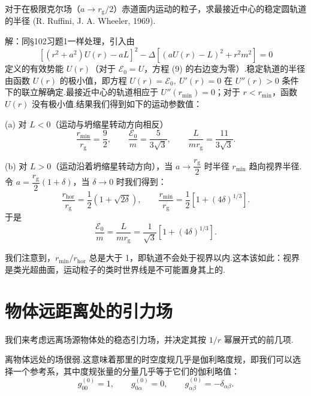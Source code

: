 \begin{xiti}
\quad 对于在极限克尔场（$a\to r_{\mathrm{g}}/2$）赤道面内运动的粒子，求最接近中心的稳定圆轨道的半径 (R. Ruffini, J. A. Wheeler, 1969).

解：同§102习题1一样处理，引入由
\begin{equation*}
  \left[(r^{2}+a^{2})U(r)-aL\right]^{2}
  -\varDelta\left[(aU(r)-L)^{2}+r^{2}m^{2}\right]=0
\end{equation*}
定义的有效势能 $U(r)$（对于 $\mathcal{E}_0=U$，方程 (9) 的右边变为零）.稳定轨道的半径由函数 $U(r)$ 的极小值，即方程 $U(r)=\mathcal{E}_0,\ U'(r)=0$ 在 $U''(r)>0$ 条件下的联立解确定.最接近中心的轨道相应于 $U''(r_{\mathrm{min}})=0$；对于 $r<r_{\mathrm{min}}$，函数 $U(r)$ 没有极小值.结果我们得到如下的运动参数值：

(a) 对 $L<0$（运动与坍缩星转动方向相反）
\begin{equation*}
  \frac{r_{\mathrm{min}}}{r_{\mathrm{g}}}=\frac{9}{2},
  \qquad
  \frac{\mathcal{E}_0}{m}=\frac{5}{3\sqrt{3}},
  \qquad
  \frac{L}{mr_{\mathrm{g}}}=\frac{11}{3\sqrt{3}}.
\end{equation*}

(b) 对 $L>0$（运动沿着坍缩星转动方向），当 $a\to\dfrac{r_{\mathrm{g}}}{2}$ 时半径 $r_{\mathrm{min}}$ 趋向视界半径.令 $a=\dfrac{r_{\mathrm{g}}}{2}(1+\delta)$，当 $\delta\to0$ 时我们得到：
\begin{equation*}
  \frac{r_{\mathrm{hor}}}{r_{\mathrm{g}}}
  =\frac{1}{2}(1+\sqrt{2\delta}),\qquad
  \frac{r_{\mathrm{min}}}{r_{\mathrm{g}}}
  =\frac{1}{2}\left[1+(4\delta)^{1/3}\right].
\end{equation*}
于是
\begin{equation*}
  \frac{\mathcal{E}_0}{m}
  =\frac{L}{mr_{\mathrm{g}}}
  =\frac{1}{\sqrt{3}}\left[1+(4\delta)^{1/3}\right].
\end{equation*}

我们注意到，$r_{\mathrm{min}}/r_{\mathrm{hor}}$ 总是大于 1，即轨道不会处于视界以内.这本该如此：视界是类光超曲面，运动粒子的类时世界线是不可能置身其上的.

\end{xiti}

\section{物体远距离处的引力场}

我们来考虑远离场源物体处的稳态引力场，并决定其按 $1/r$ 幂展开式的前几项.

离物体远处的场很弱.这意味着那里的时空度规几乎是伽利略度规，即我们可以选择一个参考系，其中度规张量的分量几乎等于它们的伽利略值：
\begin{equation}
  g_{00}^{(0)}=1,\qquad g_{0\alpha}^{(0)}=0,\qquad
  g_{\alpha\beta}^{(0)}=-\delta_{\alpha\beta}.
\end{equation}

